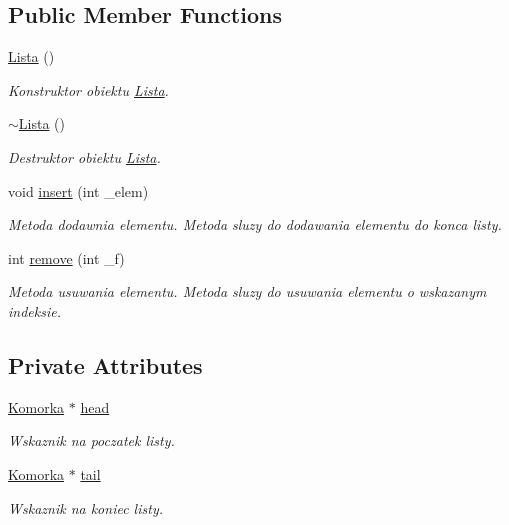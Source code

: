\subsection*{Public Member Functions}
\begin{DoxyCompactItemize}
\item 
\hyperlink{class_lista_a1f668b36909182ef1360b48503529a31}{Lista} ()
\begin{DoxyCompactList}\small\item\em Konstruktor obiektu \hyperlink{class_lista}{Lista}. \end{DoxyCompactList}\item 
\hyperlink{class_lista_a4d7394b2728a00ad8404965b2e15d096}{$\sim$\+Lista} ()
\begin{DoxyCompactList}\small\item\em Destruktor obiektu \hyperlink{class_lista}{Lista}. \end{DoxyCompactList}\item 
void \hyperlink{class_lista_acec8ac807da644d8250c3c6043a208e1}{insert} (int \+\_\+elem)
\begin{DoxyCompactList}\small\item\em Metoda dodawnia elementu. Metoda sluzy do dodawania elementu do konca listy. \end{DoxyCompactList}\item 
int \hyperlink{class_lista_a18ce18bccb1af9b8d818f103021d7b4a}{remove} (int \+\_\+f)
\begin{DoxyCompactList}\small\item\em Metoda usuwania elementu. Metoda sluzy do usuwania elementu o wskazanym indeksie. \end{DoxyCompactList}\end{DoxyCompactItemize}
\subsection*{Private Attributes}
\begin{DoxyCompactItemize}
\item 
\hyperlink{struct_lista_1_1_komorka}{Komorka} $\ast$ \hyperlink{class_lista_aeba20505030183d334971bd44c3c8b95}{head}
\begin{DoxyCompactList}\small\item\em Wskaznik na poczatek listy. \end{DoxyCompactList}\item 
\hyperlink{struct_lista_1_1_komorka}{Komorka} $\ast$ \hyperlink{class_lista_a7d42e5f99e945d97c29d6f764f71f4e7}{tail}
\begin{DoxyCompactList}\small\item\em Wskaznik na koniec listy. \end{DoxyCompactList}\end{DoxyCompactItemize}


